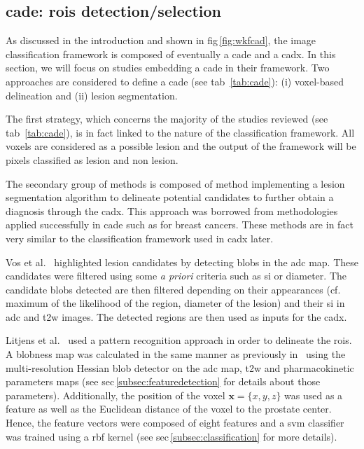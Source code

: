 \subsection{\ac{cade}: \acp{roi} detection/selection}\label{cade}

As discussed in the introduction and shown in \ac{fig}\,\ref{fig:wkfcad}, the image classification framework is composed of eventually a \ac{cade} and a \ac{cadx}. In this section, we will focus on studies embedding a \ac{cade} in their framework. Two approaches are considered to define a \ac{cade} (see \ac{tab}~\ref{tab:cade}): (i) voxel-based delineation and (ii) lesion segmentation.

The first strategy, which concerns the majority of the studies reviewed (see \ac{tab}~\ref{tab:cade}), is in fact linked to the nature of the classification framework. All voxels are considered as a possible lesion and the output of the framework will be pixels classified as lesion and non lesion.

The secondary group of methods is composed of method implementing a lesion segmentation algorithm to delineate potential candidates to further obtain a diagnosis through the \ac{cadx}. This approach was borrowed from methodologies applied successfully in \ac{cade} such as for breast cancers. These methods are in fact very similar to the classification framework used in \ac{cadx} later.

Vos et al.~\cite{Vos2012} highlighted lesion candidates by detecting blobs in the \ac{adc} map. These candidates were filtered using some \textit{a priori} criteria such as \ac{si} or diameter. The candidate blobs detected are then filtered depending on their appearances (cf. maximum of the likelihood of the region, diameter of the lesion) and their \ac{si} in \ac{adc} and \ac{t2w} images. The detected regions are then used as inputs for the \ac{cadx}.

Litjens et al.~\cite{Litjens2011} used a pattern recognition approach in order to delineate the \acp{roi}. A blobness map was calculated in the same manner as previously in~\cite{Vos2010} using the multi-resolution Hessian blob detector on the \ac{adc} map, \ac{t2w} and pharmacokinetic parameters maps (see \ac{sec}\,\ref{subsec:featuredetection} for details about those parameters). Additionally, the position of the voxel $\mathbf{x}=\{x,y,z\}$ was used as a feature as well as the Euclidean distance of the voxel to the prostate center. Hence, the feature vectors were composed of eight features and a \ac{svm} classifier was trained using a \ac{rbf} kernel (see \ac{sec}\,\ref{subsec:classification} for more details).

